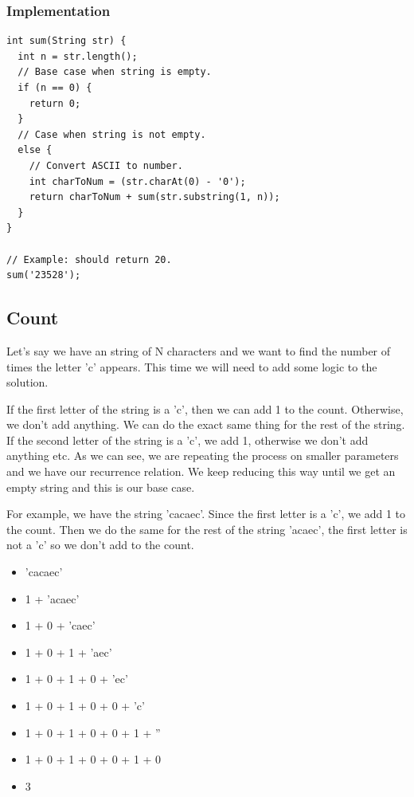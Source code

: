 \documentclass[11pt,oneside]{book}
\begin{document}
\subsubsection{Implementation}

\begin{lstlisting}
int sum(String str) {
  int n = str.length();
  // Base case when string is empty.
  if (n == 0) {
    return 0;
  }
  // Case when string is not empty.
  else {
    // Convert ASCII to number.
    int charToNum = (str.charAt(0) - '0');
    return charToNum + sum(str.substring(1, n));
  }
}

// Example: should return 20.
sum('23528');
\end{lstlisting}

\subsection{Count}

Let's say we have an string of N characters and we want to find the number of times the letter 'c' appears. This time we will need to add some logic to the solution.

If the first letter of the string is a 'c', then we can add 1 to the count. Otherwise, we don't add anything. We can do the exact same thing for the rest of the string. If the second letter of the string is a 'c', we add 1, otherwise we don't add anything etc. As we can see, we are repeating the process on smaller parameters and we have our recurrence relation. We keep reducing this way until we get an empty string and this is our base case.

For example, we have the string 'cacaec'. Since the first letter is a 'c', we add 1 to the count. Then we do the same for the rest of the string 'acaec', the first letter is not a 'c' so we don't add to the count.

\begin{itemize}
\item 'cacaec'
\item 1 + 'acaec'
\item 1 + 0 + 'caec'
\item 1 + 0 + 1 + 'aec'
\item 1 + 0 + 1 + 0 + 'ec'
\item 1 + 0 + 1 + 0 + 0 + 'c'
\item 1 + 0 + 1 + 0 + 0 + 1 + ''
\item 1 + 0 + 1 + 0 + 0 + 1 + 0
\item 3
\end{itemize}
\end{document}
